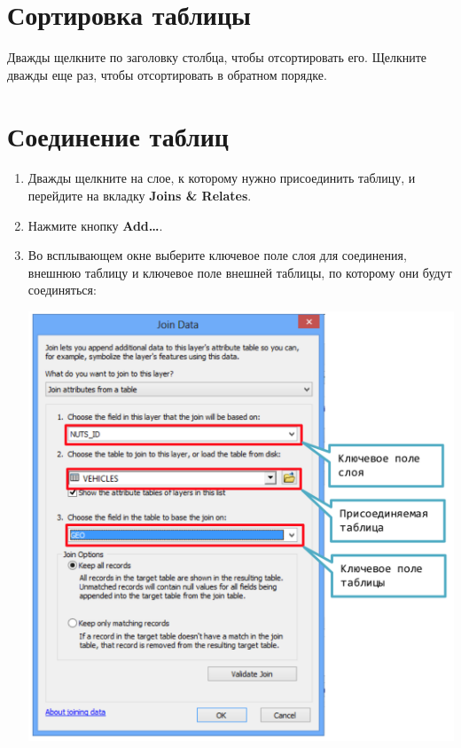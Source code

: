 \documentclass[]{book}
\theoremstyle{definition}
\theoremstyle{definition}
\theoremstyle{definition}
\theoremstyle{remark}
\begin{document}
\hypertarget{-}{%
\section{Сортировка таблицы}\label{-}}

Дважды щелкните по заголовку столбца, чтобы отсортировать его. Щелкните
дважды еще раз, чтобы отсортировать в обратном порядке.

\hypertarget{-}{%
\section{Соединение таблиц}\label{-}}

\begin{enumerate}
\def\labelenumi{\arabic{enumi}.}
\item
  Дважды щелкните на слое, к которому нужно присоединить таблицу, и
  перейдите на вкладку \textbf{Joins \& Relates}.
\item
  Нажмите кнопку \textbf{Add\ldots{}}.
\item
  Во всплывающем окне выберите ключевое поле слоя для соединения,
  внешнюю таблицу и ключевое поле внешней таблицы, по которому они будут
  соединяться:

  \includegraphics{images/Appendix/image72.png}
\end{enumerate}
\end{document}
